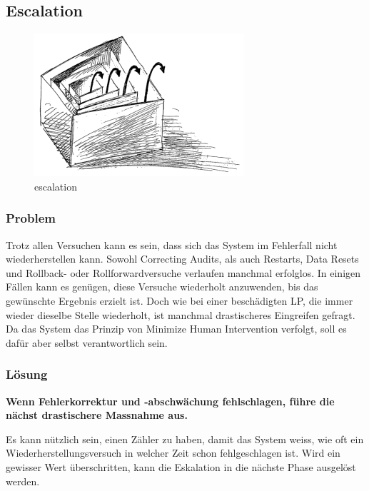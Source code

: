 \subsection{Escalation}

\begin{figure}[H]
	\centering
	\includegraphics[width=\textwidth]{content/faulttolerance/images/escalation.png}
	\caption{escalation}
\end{figure}

\subsubsection*{Problem}

Trotz allen Versuchen kann es sein, dass sich das System im Fehlerfall nicht wiederherstellen kann. Sowohl Correcting Audits, als auch Restarts, Data Resets und Rollback- oder Rollforwardversuche verlaufen manchmal erfolglos. In einigen Fällen kann es genügen, diese Versuche wiederholt anzuwenden, bis das gewünschte Ergebnis erzielt ist. Doch wie bei einer beschädigten LP, die immer wieder dieselbe Stelle wiederholt, ist manchmal drastischeres Eingreifen gefragt. Da das System das Prinzip von Minimize Human Intervention verfolgt, soll es dafür aber selbst verantwortlich sein.

\subsubsection*{Lösung}

\textbf{\textbf{Wenn Fehlerkorrektur und -abschwächung fehlschlagen, führe die nächst drastischere Massnahme aus.}}

Es kann nützlich sein, einen Zähler zu haben, damit das System weiss, wie oft ein Wiederherstellungsversuch in welcher Zeit schon fehlgeschlagen ist. Wird ein gewisser Wert überschritten, kann die Eskalation in die nächste Phase ausgelöst werden.

